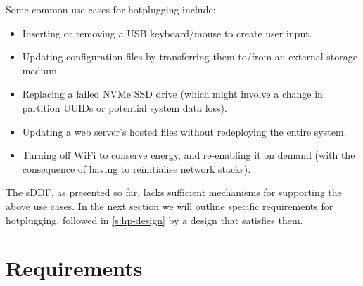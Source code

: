 \documentclass[a4paper,12pt]{report}
\begin{document}
Some common use cases for hotplugging include:

\begin{itemize}
  \item Inserting or removing a USB keyboard/mouse to create user input.

  \item Updating configuration files by transferring them to/from an external storage medium.

  \item Replacing a failed NVMe SSD drive (which might involve a change in partition UUIDs
        or potential system data loss).

  \item Updating a web server's hosted files without redeploying the entire system.

  \item Turning off WiFi to conserve energy, and re-enabling it on
    demand (with the consequence of having to reinitialise network stacks).
\end{itemize}

The sDDF, as presented so far, lacks sufficient mechanisms for
supporting the above use cases. In the next section we will outline
specific requirements for hotplugging, followed in
\autoref{s:hp-design} by a design that satisfies them.

\section{Requirements}
\end{document}

